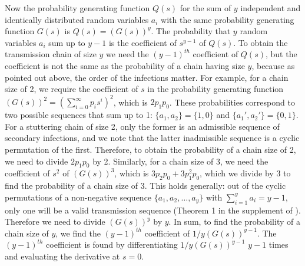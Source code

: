 \documentclass{imammb}
\numberwithin{equation}{section}
\begin{document}

Now the probability generating function $Q(s)$ for the sum of $y$ independent and identically distributed random variables $a_i$ with the same probability generating function $G(s)$ is $Q(s) = (G(s))^y$. The probability that $y$ random variables $a_i$ sum up to $y-1$ is the coefficient of $s^{y-1}$ of $Q(s)$. To obtain the transmission chain of size $y$ we need the $(y-1)^{th}$ coefficient of $Q(s)$, but the coefficient is not the same as the probability of a chain having size $y$, because as pointed out above, the order of the infections matter. For example, for a chain size of 2, we require the coefficient of $s$ in the probability generating function $(G(s))^2 = (\sum_{i=0}^\infty p_i s^i)^2$, which is $2 p_1 p_0$. These probabilities correspond to two possible sequences that sum up to 1: $\{a_1 ,a_2\} = \{1, 0\}$ and $\{a_1', a_2'\} = \{0 ,1\}$. For a stuttering chain of size 2, only the former is an admissible sequence of secondary infections, and we note that the latter inadmissible sequence is a cyclic permutation of the first. Therefore, to obtain the probability of a chain size of 2, we need to divide $2 p_1 p_0$ by 2. Similarly, for a chain size of 3, we need the coefficient of $s^2$ of $(G(s))^3$, which is $3p_2 p_0 + 3 p_1^2 p_0$, which we divide by 3 to find the probability of a chain size of 3.  This holds generally: out of the cyclic permutations of a non-negative sequence $\{a_1, a_2,\dots,a_y\}$ with $\sum_{i=1}^y a_i = y-1$, only one will be a valid transmission sequence (Theorem 1 in the supplement of \citet{Blumberg2013-xv}). Therefore we need to divide $(G(s))^y$ by $y$. In sum, to find the probability of a chain size of $y$, we find the $(y-1)^{th}$ coefficient of $1/y (G(s))^{y-1} $. The $(y-1)^{th}$ coefficient is found by differentiating $1/y (G(s))^{y-1} $ $y-1$ times and evaluating the derivative at $s=0$. 

\end{document}
